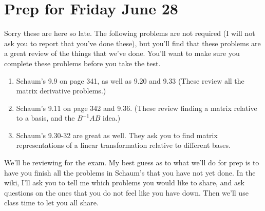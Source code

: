 \documentclass[letterpaper,oneside]{book}%
\theoremstyle{plain}
\theoremstyle{box}
\theoremstyle{problem}
\newtheorem*{hwenum*}{Home Work Practice}
\newenvironment{hw*}[1][]{\begin{hwenum*}[#1]}{\end{hwenum*}\nopagebreak\hrule\bigskip}
\begin{document}
\section{Prep for Friday June 28}

\begin{hw*}
 Sorry these are here so late. The following problems are not required (I will not ask you to report that you've done these), but you'll find that these problems are a great review of the things that we've done. You'll want to make sure you complete these problems before you take the test.
 \begin{enumerate}
  \item Schaum's 9.9 on page 341, as well as 9.20 and 9.33 (These review all the matrix derivative problems.) 
  \item Schaum's 9.11 on page 342 and 9.36. (These review finding a matrix relative to a basis, and the $B^{-1}AB$ idea.) 
  \item Schaum's 9.30-32 are great as well. They ask you to find matrix representations of a linear transformation relative to different bases. 
 \end{enumerate}
\end{hw*}

We'll be reviewing for the exam.  My best guess as to what we'll do for prep is to have you finish all the problems in Schaum's that you have not yet done. In the wiki, I'll ask you to tell me which problems you would like to share, and ask questions on the ones that you do not feel like you have down.  Then we'll use class time to let you all share.
\end{document}
